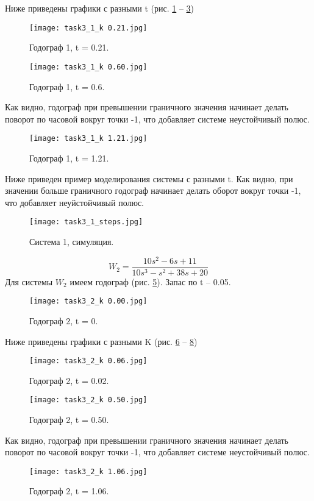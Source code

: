 \documentclass[16pt]{article}
\begin{document}
Ниже приведены графики с разными t (рис. \ref*{fig:fig11} -- \ref*{fig:fig13})
\begin{figure}[h!]
    \centering
    \texttt{[image: task3\_1\_k 0.21.jpg]}
    \caption{Годограф 1, t = 0.21.}
    \label{fig:fig11}
\end{figure}
\begin{figure}[h!]
    \centering
    \texttt{[image: task3\_1\_k 0.60.jpg]}
    \caption{Годограф 1, t = 0.6.}
    \label{fig:fig12}
\end{figure}
Как видно, годограф при превышении граничного значения начинает делать поворот по часовой вокруг точки -1, что добавляет системе неустойчивый полюс.
\begin{figure}[h!]
    \centering
    \texttt{[image: task3\_1\_k 1.21.jpg]}
    \caption{Годограф 1, t = 1.21.}
    \label{fig:fig13}
\end{figure}

Ниже приведен пример моделирования системы с разными t. Как видно, при значении больше граничного годограф начинает делать оборот вокруг точки -1, что добавляет неуйстойчивый полюс.

\begin{figure}[h!]
    \centering
    \texttt{[image: task3\_1\_steps.jpg]}
    \caption{Система 1, симуляция.}
    \label{fig:fig14}
\end{figure}

\[W_2 = \frac{10s^2 - 6s + 11}{10s^3 - s^2 + 38s + 20}\]
Для системы \(W_2\) имеем годограф (рис. \ref*{fig:fig15}). Запас по t -- 0.05.
\begin{figure}[h!]
    \centering
    \texttt{[image: task3\_2\_k 0.00.jpg]}
    \caption{Годограф 2, t = 0.}
    \label{fig:fig15}
\end{figure}

Ниже приведены графики с разными K (рис. \ref*{fig:fig16} -- \ref*{fig:fig18})
\begin{figure}[h!]
    \centering
    \texttt{[image: task3\_2\_k 0.06.jpg]}
    \caption{Годограф 2, t = 0.02.}
    \label{fig:fig16}
\end{figure}
\begin{figure}[h!]
    \centering
    \texttt{[image: task3\_2\_k 0.50.jpg]}
    \caption{Годограф 2, t = 0.50.}
    \label{fig:fig17}
\end{figure}
Как видно, годограф при превышении граничного значения начинает делать поворот по часовой вокруг точки -1, что добавляет системе неустойчивый полюс.
\begin{figure}[h!]
    \centering
    \texttt{[image: task3\_2\_k 1.06.jpg]}
    \caption{Годограф 2, t = 1.06.}
    \label{fig:fig18}
\end{figure}
\end{document}

